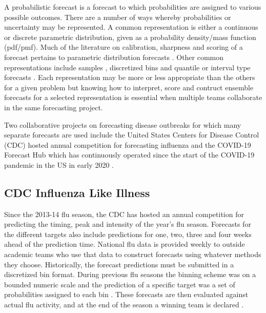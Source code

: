 \documentclass[11pt,notitlepage]{isuthesis}
\begin{document}
A probabilistic forecast is a forecast to which probabilities are assigned to 
various possible outcomes. There are a number of ways whereby probabilities or 
uncertainty may be represented. A common representation is either a continuous 
or
discrete parametric distribution, given as a probability density/mass function 
(pdf/pmf). Much of the literature 
on calibration, sharpness and scoring of a forecast pertains to parametric 
distribution forecasts
\cite{gneiting2007probabilistic,gneiting2013combining,baran2018combining}.
Other common representations include samples \cite{krueger2016probabilistic}, 
discretized bins \cite{mcgowan2019collaborative}
and quantile or interval type forecasts \cite{taylor2021evaluating} 
\cite{bracher2021evaluating}. Each representation may be more or less 
appropriate than the others for a given problem but knowing how to interpret, 
score and contruct ensemble forecasts for a selected representation is essential
when multiple teams collaborate in the same forecasting project.


Two collaborative projects on forecasting disease outbreaks for which many 
separate forecasts 
are used include the United States Centers for Disease Control (CDC) hosted
annual competition for forecasting influenza \cite{cdcflusight}
and the COVID-19 Forecast Hub which has 
continuously operated since the start of the COVID-19 pandemic in the US in 
early 2020 \cite{Cramer2021-hub-dataset}.

\subsection{CDC Influenza Like Illness}

Since the 2013-14 flu season, the CDC has hosted an annual competition for 
predicting the timing, peak and intensity of the year's flu season. Forecasts
for the different targets also include predictions for one, two, three and 
four weeks ahead of the prediction time. National flu data is provided weekly 
to outside academic teams who use that data to construct forecasts using 
whatever methods they choose. Historically, the forecast predictions must be 
submitted 
in a discretized bin
format. During previous flu seasons the binning scheme was on a bounded numeric 
scale and the 
prediction of a specific target was a set of probabilities assigned to each bin
\cite{mcgowan2019collaborative}.
These forecasts are then evaluated against actual flu activity, and at 
the end of the season a winning team is declared \cite{cdcflusight}.
\end{document}

